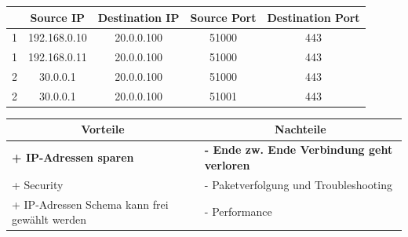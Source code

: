 \begin{table}[H]
	\begin{tabular}{c|cccc}
		& Source IP & Destination IP & Source Port & Destination Port \\
		\hline
		{\color[HTML]{32CB00} 1} & 192.168.0.10 & 20.0.0.100 & 51000 & 443 \\
		{\color[HTML]{FE0000} 1} & 192.168.0.11 & 20.0.0.100 & 51000 & 443 \\
		{\color[HTML]{32CB00} 2} & 30.0.0.1 & 20.0.0.100 & 51000 & 443 \\
		{\color[HTML]{FE0000} 2} & 30.0.0.1 & 20.0.0.100 & 51001 & 443
	\end{tabular}
\end{table}

\begin{table}[H]
	\begin{tabular}{p{} | p{}}
		\multicolumn{1}{c}{\textbf{Vorteile}} & \multicolumn{1}{|c}{\textbf{Nachteile}} \\
		\hline
		\textbf{+ IP-Adressen sparen} & \textbf{- Ende zw. Ende Verbindung geht verloren} \\
		+ Security & - Paketverfolgung und Troubleshooting \\
		+ IP-Adressen Schema kann frei gewählt werden & - Performance \\
	\end{tabular}
\end{table}

